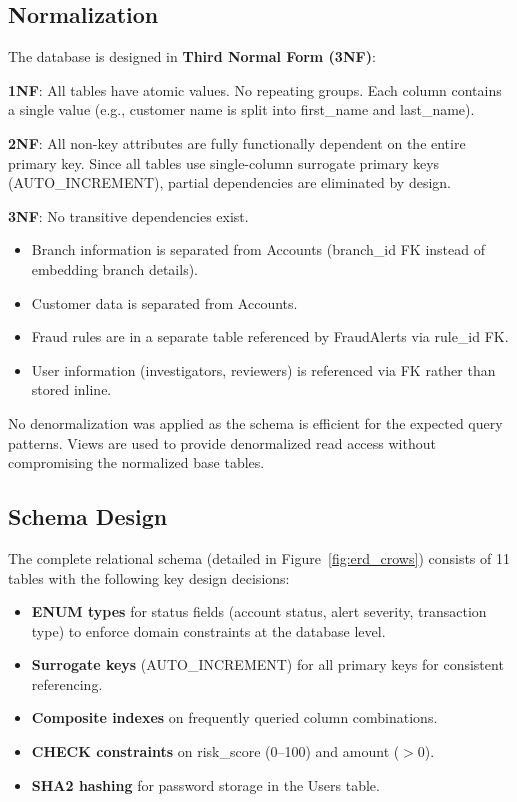 \documentclass[a4paper,12pt]{article}
\begin{document}
\subsection{Normalization}
The database is designed in \textbf{Third Normal Form (3NF)}:

\textbf{1NF}: All tables have atomic values. No repeating groups. Each column contains a single value (e.g., customer name is split into first\_name and last\_name).

\textbf{2NF}: All non-key attributes are fully functionally dependent on the entire primary key. Since all tables use single-column surrogate primary keys (AUTO\_INCREMENT), partial dependencies are eliminated by design.

\textbf{3NF}: No transitive dependencies exist.
\begin{itemize}
    \item Branch information is separated from Accounts (branch\_id FK instead of embedding branch details).
    \item Customer data is separated from Accounts.
    \item Fraud rules are in a separate table referenced by FraudAlerts via rule\_id FK.
    \item User information (investigators, reviewers) is referenced via FK rather than stored inline.
\end{itemize}

No denormalization was applied as the schema is efficient for the expected query patterns. Views are used to provide denormalized read access without compromising the normalized base tables.

\subsection{Schema Design}
The complete relational schema (detailed in Figure~\ref{fig:erd_crows}) consists of 11 tables with the following key design decisions:
\begin{itemize}
    \item \textbf{ENUM types} for status fields (account status, alert severity, transaction type) to enforce domain constraints at the database level.
    \item \textbf{Surrogate keys} (AUTO\_INCREMENT) for all primary keys for consistent referencing.
    \item \textbf{Composite indexes} on frequently queried column combinations.
    \item \textbf{CHECK constraints} on risk\_score (0--100) and amount ($> 0$).
    \item \textbf{SHA2 hashing} for password storage in the Users table.
\end{itemize}
\end{document}

